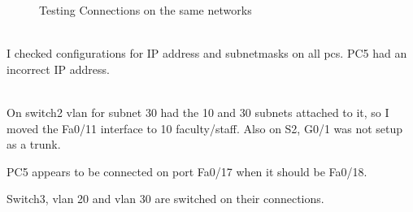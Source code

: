 \documentclass[../EngineeringJournal_CDavis.tex]{subfiles}
\begin{document}
\begin{figure}[!hbt]\centering
{}\par
{}\hfill
{}\par
\caption{Testing Connections on the same networks}
\label{Ping11}
\end{figure}





\\I checked configurations for IP address and subnetmasks on all pcs. 
PC5 had an incorrect IP address.

\noindent{}
\\On switch2 vlan for subnet 30 had the 10 and 30 subnets attached to it, so I
moved the Fa0/11 interface to 10 faculty/staff. Also on S2, G0/1 was not setup
as a trunk.

PC5 appears to be connected on port Fa0/17 when it should be Fa0/18.

Switch3, vlan 20 and vlan 30 are switched on their connections.
\end{document}
